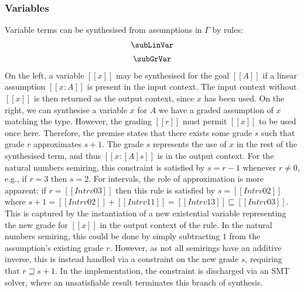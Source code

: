   \subsubsection{Variables}
Variable terms can be synthesised from assumptions in $\Gamma$ by rules:
  \begin{align*}
    \begin{array}{c}
  \subLinVar
  \\[0.5em]
  \subGrVar
    \end{array}
  \end{align*}
%
On the left, a variable $[[x]]$ may be synthesised for the goal
$[[ A ]]$ if a linear assumption $[[ x : A ]]$ is present
  in the input context. The input context without $[[x]]$ is then returned as
  the output context, since $x$ has been used. On the right,
  we can synthesise a variable $x$ for $A$ we have a graded
  assumption of $x$ matching the type. However, %
  the grading $[[ r ]]$ must permit $[[ x ]]$ to
  be used once here. Therefore, the premise states that there exists
  some grade $s$ such that grade $r$ approximates $s + 1$. The grade $s$
  represents the use of $x$ in the rest of the synthesised term, and
  thus $[[ x : [ A ] s ]]$ is in the output context. For the natural
  numbers semiring, this constraint is satisfied by $s = r - 1$ whenever $r \neq
  0$, e.g., if $r = 3$ then $s = 2$. For
  intervals, the role of approximation is more apparent: if $r = [[
  Intrv 0 3]]$ then this rule is satisfied by $s = [[ Intrv 0 2 ]]$
  where $s + 1 = [[ Intrv 0 2 ]] + [[ Intrv 1 1 ]] = [[ Intrv 1 3 ]]
  \sqsubseteq [[ Intrv 0 3 ]]$.
  This is captured by the instantiation of a new
  existential variable representing the new grade for $[[x]]$ in the output
  context of the rule. In the natural numbers semiring, this could be done by
  simply subtracting $1$ from the assumption's
  existing grade $r$. However, as not all semirings have an
  additive inverse, this is instead handled via a constraint on the new grade
  $s$, requiring that $ r \sqsupseteq s + 1 $. In the implementation, the constraint is
  discharged via an SMT solver, where an unsatisfiable result terminates
  this branch of synthesis.

